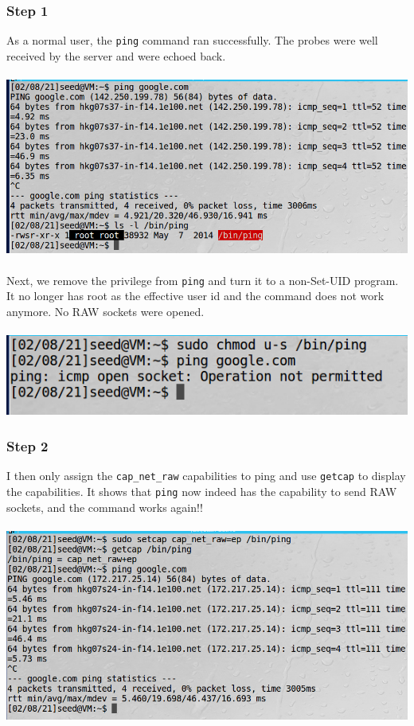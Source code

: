 \documentclass[a4paper]{article}
\begin{document}
\subsubsection{Step 1}
As a normal user, the \verb+ping+ command ran successfully. The probes were well received by the server and were echoed back.\\\\
\includegraphics[scale=0.7]{1/6.png}\\\\
Next, we remove the privilege from \verb+ping+ and turn it to a non-Set-UID program. It no longer has root as the effective user id and the command does not work anymore. No RAW sockets were opened.\\\\
\includegraphics[scale=0.7]{1/7.png}
\subsubsection{Step 2}
I then only assign the \verb+cap_net_raw+ capabilities to ping and use \verb+getcap+ to display the capabilities. It shows that \verb+ping+ now indeed has the capability to send RAW sockets, and the command works again!!\\\\
\includegraphics[scale=0.7]{1/8.png}
\end{document}
